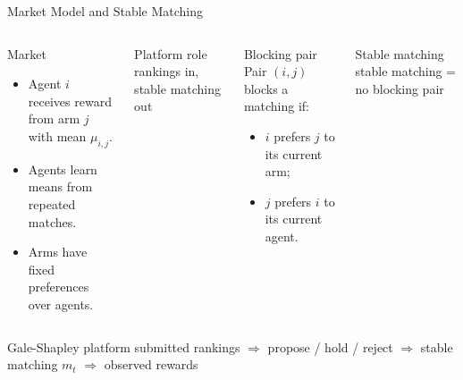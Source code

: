 \documentclass[aspectratio=169,11pt]{beamer}
\begin{document}
\begin{frame}{Market Model and Stable Matching}
  \begin{columns}[T,onlytextwidth]
    \begin{block}{Market}
      \begin{itemize}
        \item Agent $i$ receives reward from arm $j$ with mean $\mu_{i,j}$.
        \item Agents learn means from repeated matches.
        \item Arms have fixed preferences over agents.
      \end{itemize}
    \end{block}

    \vspace{0.12cm}
    \begin{block}{Platform role}
      \centering
      rankings in, stable matching out
    \end{block}

    \begin{block}{Blocking pair}
      Pair $(i,j)$ blocks a matching if:
      \begin{itemize}
        \item $i$ prefers $j$ to its current arm;
        \item $j$ prefers $i$ to its current agent.
      \end{itemize}
    \end{block}

    \begin{block}{Stable matching}
      \centering
      stable matching = no blocking pair
    \end{block}
  \end{columns}

  \vspace{0.15cm}
  \begin{block}{Gale-Shapley platform}
    \centering
    submitted rankings
    \quad $\Longrightarrow$ \quad
    propose / hold / reject
    \quad $\Longrightarrow$ \quad
    stable matching $m_t$
    \quad $\Longrightarrow$ \quad
    observed rewards
  \end{block}
\end{frame}
\end{document}
